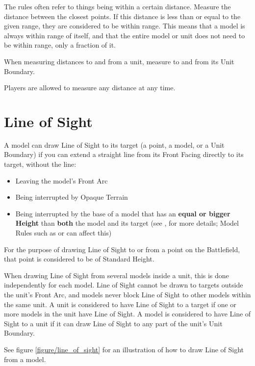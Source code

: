 The rules often refer to things being within a certain distance. Measure the distance between the closest points. If this distance is less than or equal to the given range, they are considered to be within range. This means that a model is always within range of itself, and that the entire model or unit does not need to be within range, only a fraction of it.

When measuring distances to and from a unit, measure to and from its Unit Boundary.

Players are allowed to measure any distance at any time.

\section{Line of Sight}
\label{line_of_sight}

A model can draw Line of Sight to its target (a point, a model, or a Unit Boundary) if you can extend a straight line from its Front Facing directly to its target, without the line:
\begin{itemize}
\item Leaving the model's Front Arc
\item Being interrupted by Opaque Terrain
\item Being interrupted by the base of a model that has an \textbf{equal or bigger Height} than \textbf{both} the model and its target (see , for more details; Model Rules such as \hyperref[tall]{\tall} or \hyperref[skirmisher]{\skirmisher} can affect this)
\end{itemize}


For the purpose of drawing Line of Sight to or from a point on the Battlefield, that point is considered to be of Standard Height.

When drawing Line of Sight from several models inside a unit, this is done independently for each model. Line of Sight cannot be drawn to targets outside the unit's Front Arc, and models never block Line of Sight to other models within the same unit. A unit is considered to have Line of Sight to a target if one or more models in the unit have Line of Sight. A model is considered to have Line of Sight to a unit if it can draw Line of Sight to any part of the unit's Unit Boundary.

See figure \ref{figure/line_of_sight} for an illustration of how to draw Line of Sight from a model.

